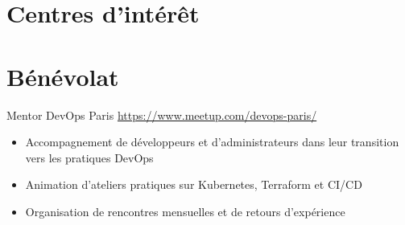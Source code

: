 \documentclass[a4paper, serif, 10pt]{moderncv}
\begin{document}
\section{Centres d'intérêt}

\section{Bénévolat}

        {Mentor}
        {DevOps Paris}
        {\url{https://www.meetup.com/devops-paris/}}
        {}
        {\begin{itemize}
\item Accompagnement de développeurs et d'administrateurs dans leur transition vers les pratiques DevOps
\item Animation d'ateliers pratiques sur Kubernetes, Terraform et CI/CD
\item Organisation de rencontres mensuelles et de retours d'expérience
\end{itemize}}
    
\end{document}

